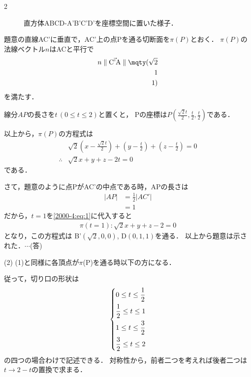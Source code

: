 \documentclass[../../../../main.tex]{subfiles}
\begin{document}
\begin{multicols}{2}
\begin{figure}[H]
    \caption{直方体ABCD-A'B'C'D'を座標空間に置いた様子．}
    \label{2000-4:fig:1}
  \end{figure}

  題意の直線AC'に垂直で，AC'上の点Pを通る切断面を$\pi(P)$とおく．
  $\pi(P)$の法線ベクトル$n$はACと平行で
  \begin{align*}
    n \parallel \vec{\text{C'A}} \parallel \mqty(\sqrt{2} \\ 1 \\ 1 )
  \end{align*}
  を満たす．

  線分$AP$の長さを$t\, (0\le t\le 2)$と置くと，
  Pの座標は$P(\frac{\sqrt{2}t}{2},\frac{t}{2},\frac{t}{2})$である．

  以上から，$\pi(P)$の方程式は
  \begin{align}
     & \sqrt{2}\left(x - \frac{\sqrt{2}t}{2} \right) + \left(y - \frac{t}{2}\right) + \left(z - \frac{t}{2}\right) = 0 \\
    \therefore
     & \sqrt{2}x + y + z - 2t = 0 \label{2000-4:eq:1}
  \end{align}
  である．

  さて，題意のように点PがAC'の中点である時，APの長さは
  \begin{align*}
    |AP|
     & = \frac{1}{2}|AC'| \\
     & = 1
  \end{align*}
  だから，$t=1$を\cref{2000-4:eq:1}に代入すると
  \begin{align*}
    \pi(t=1): \sqrt{2}x + y + z - 2 = 0
  \end{align*}
  となり，この方程式は
  B'$(\sqrt{2},0,0)$, D$(0,1,1)$を通る．
  以上から題意は示された．$\cdots$(答)
  \vspace{10pt}

  (2)
  (1)と同様に各頂点が$\pi$(P)を通る時以下の方になる．

  従って，切り口の形状は
  \begin{align*}
    \begin{dcases}
      0 \le t \le \frac{1}{2} \\
      \frac{1}{2} \le t \le 1 \\
      1 \le t \le \frac{3}{2} \\
      \frac{3}{2} \le t \le 2 \\
    \end{dcases}
  \end{align*}
  の四つの場合わけで記述できる．
  対称性から，前者二つを考えれば後者二つは$t\to 2-t$の置換で求まる．


\end{multicols}
\end{document}
